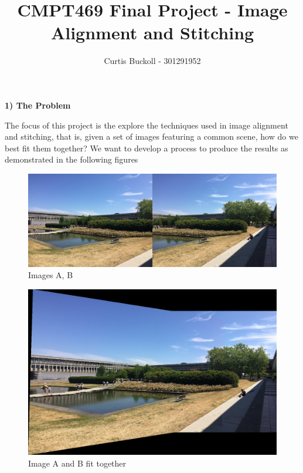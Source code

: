 \documentclass[]{article}
\title{CMPT469 Final Project - Image Alignment and Stitching}
\author{Curtis Buckoll - 301291952}
\begin{document}
\maketitle


\vspace{5mm}
\textbf{1) The Problem}
\vspace{3mm}

The focus of this project is the explore the techniques used in image alignment and stitching, that is, given a set of images featuring a common scene, how do we best fit them together? We want to develop a process to produce the results as demonstrated in the following figures

\begin{figure}[h]
	\includegraphics[scale=0.55]{results/p1_noblend/1}
	\centering
	\caption{Images A, B}
\end{figure}
\begin{figure}[h]
	\includegraphics[scale=0.25]{results/p1_noblend/4}
	\centering
	\caption{Image A and B fit together}
\end{figure}
\end{document}
